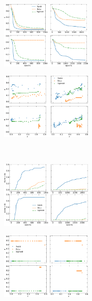 \documentclass{article}
\begin{document}
\begin{figure}[t!]
\centering
	\begin{subfigure}[]{ }
	\includegraphics[width = 0.48\textwidth]{costs.pdf}
	\label{fig:cost1}
  \end{subfigure}
	\begin{subfigure}[]{}
 		\includegraphics[width = 0.48\textwidth]{alpha.pdf}
		\label{fig:index1}
	\end{subfigure}
  ~
  \begin{subfigure}[]{}
	\includegraphics[width= 0.48\textwidth]{residues.pdf}
	\label{fig:res}
	\end{subfigure}
  \begin{subfigure}[]{}
	\includegraphics[width= 0.48\textwidth]{gamma.pdf}
	\label{fig:gamma}
	\end{subfigure}


\end{figure}
\end{document}
